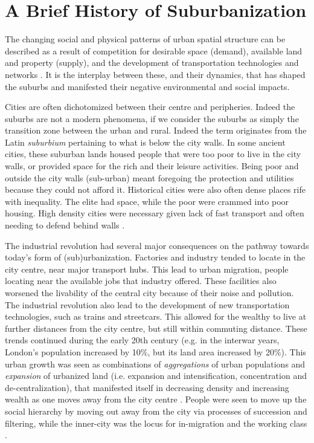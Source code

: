 

\section{A Brief History of Suburbanization}

The changing social and physical patterns of urban spatial structure can be described as a result of competition for desirable space (demand), available land and property (supply), and the development of transportation technologies and networks \cite{alonso_location_1964,anas_urban_1998}. It is the interplay between these, and their dynamics, that has shaped the suburbs and manifested their negative environmental and social impacts.

Cities are often dichotomized between their centre and peripheries. Indeed the suburbs are not a modern phenomena, if we consider the suburbs as simply the transition zone between the urban and rural. Indeed the term originates from the Latin \textit{suburbium} pertaining to what is below the city walls. In some ancient cities, these suburban lands housed people that were too poor to live in the city walls, or provided space for the rich and their leisure activities. Being poor and outside the city walls (sub-urban) meant foregoing the protection and utilities because they could not afford it. Historical cities were also often dense places rife with inequality. The elite had space, while the poor were crammed into poor housing. High density cities were necessary given lack of fast transport and often needing to defend behind walls \cite{bruegmann_sprawl:_2008}.

The industrial revolution had several major consequences on the pathway towards today's form of (sub)urbanization. Factories and industry tended to locate in the city centre, near major transport hubs. This lead to urban migration, people locating near the available jobs that industry offered. These facilities also worsened the livability of the central city because of their noise and pollution. The industrial revolution also lead to the development of new transportation technologies, such as trains and streetcars. This allowed for the wealthy to live at further distances from the city centre, but still within commuting distance. These trends continued during the early 20th century (e.g. in the interwar years, London's population increased by 10\%, but its land area increased by 20\%). This urban growth was seen as combinations of \textit{aggregations} of urban populations and \textit{expansion} of urbanized land (i.e. expansion and intensification, concentration and de-centralization), that manifested itself in decreasing density and increasing wealth as one moves away from the city centre \cite{burgess_growth_1925}. People were seen to move up the social hierarchy by moving out away from the city via processes of succession and filtering, while the inner-city was the locus for in-migration and the working class \cite{burgess_growth_1925}.

